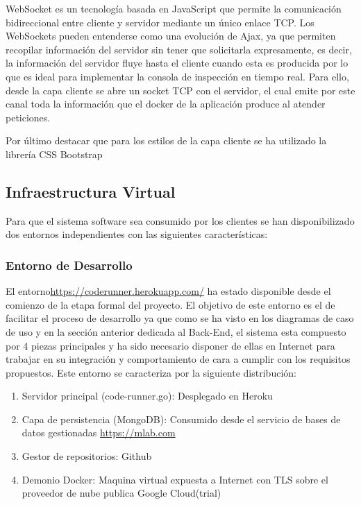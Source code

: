 \documentclass[a4paper,11pt]{book}
\begin{document}
WebSocket es un tecnología basada en JavaScript que permite la comunicación bidireccional entre cliente y servidor mediante un único enlace TCP. Los WebSockets pueden entenderse como una evolución de Ajax, ya que permiten recopilar información del servidor sin tener que solicitarla expresamente, es decir, la información del servidor fluye hasta el cliente cuando esta es producida por lo que es ideal para implementar la consola de inspección en tiempo real. Para ello, desde la capa cliente se abre un socket TCP con el servidor, el cual emite por este canal toda la información que el docker de la aplicación produce al atender peticiones.  

Por último destacar que para los estilos de la capa cliente se ha utilizado la librería CSS Bootstrap\cite{boot}

\subsection{Infraestructura Virtual}\label{iv}

Para que el sistema software sea consumido por los clientes se han disponibilizado dos entornos independientes con las siguientes características:

\subsubsection{Entorno de Desarrollo}

El entorno\url{https://coderunner.herokuapp.com/} ha estado disponible desde el comienzo de la etapa formal del proyecto. El objetivo de este entorno es el de facilitar el proceso de desarrollo ya que  como se ha visto en los diagramas de caso de uso y en la sección anterior dedicada al Back-End, el sistema esta compuesto por 4 piezas principales y ha sido necesario disponer de ellas en Internet para trabajar en su integración y comportamiento de cara a cumplir con los requisitos propuestos. Este entorno se caracteriza por la siguiente distribución: 


\begin{enumerate}
\item Servidor principal (code-runner.go): Desplegado en Heroku\cite{hero}
\item Capa de persistencia (MongoDB): Consumido desde el servicio de bases de datos gestionadas \url{https://mlab.com}
\item Gestor de repositorios: Github\cite{github}
\item Demonio Docker: Maquina virtual expuesta a Internet con TLS sobre el proveedor de nube publica Google Cloud(trial)\cite{gcp}
\end{enumerate}
\end{document}
